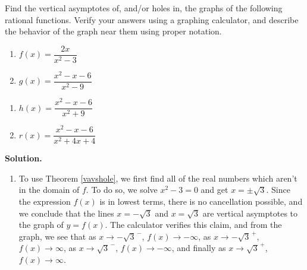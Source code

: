 \begin{ex}  \label{vavsholeexample} Find the vertical asymptotes of, and/or holes in, the graphs of the following rational functions.  Verify your answers using a graphing calculator, and describe the behavior of the graph near them using proper notation.

\begin{multicols}{2}
\begin{enumerate}

\item  $f(x) = \dfrac{2x}{x^2-3}$

\item  $g(x) = \dfrac{x^2-x-6}{x^2-9}$

\setcounter{HW}{\value{enumi}}
\end{enumerate}
\end{multicols}

\begin{multicols}{2}
\begin{enumerate}
\setcounter{enumi}{\value{HW}}


\item  $h(x) = \dfrac{x^2-x-6}{x^2+9}$

\item  $r(x) = \dfrac{x^2-x-6}{x^2+4x+4}$

\setcounter{HW}{\value{enumi}}
\end{enumerate}
\end{multicols}


{ \bf Solution.} 

\begin{enumerate}

\item  To use Theorem \ref{vavshole}, we first find all of the real numbers which aren't in the domain of $f$.  To do so, we solve $x^2 - 3 = 0$ and get $x = \pm \sqrt{3}$.  Since the expression $f(x)$ is in lowest terms, there is no cancellation possible, and we conclude that the lines $x = -\sqrt{3}$ and $x=\sqrt{3}$ are vertical asymptotes to the graph of $y=f(x)$.  The calculator verifies this claim, and from the graph, we see that as $x \rightarrow -\sqrt{3}^{\, -}$, $f(x) \rightarrow -\infty$, as $x\rightarrow -\sqrt{3}^{\, +}$, $f(x) \rightarrow \infty$, as $x \rightarrow \sqrt{3}^{\, -}$, $f(x) \rightarrow -\infty$, and finally as $x\rightarrow \sqrt{3}^{\, +}$, $f(x) \rightarrow \infty$.


\end{enumerate}
\end{ex}
